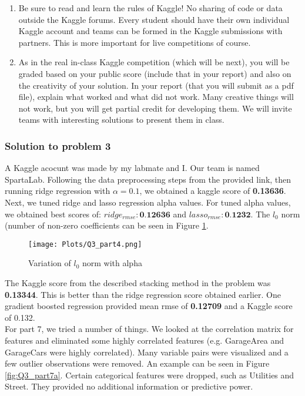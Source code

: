 \documentclass[12pt]{article}%
\begin{document}
\begin{enumerate}
    \item Be sure to read and learn the rules of Kaggle! No sharing of code or data outside the Kaggle forums. Every student should have their own individual Kaggle account and teams can be formed in the Kaggle submissions with partners. This is more important for live competitions of course.
    \item As in the real in-class Kaggle competition (which will be next), you will be graded based on your public score (include that in your report) and also on the creativity of your solution. In your report (that you will submit as a pdf file), explain what worked and what did not work. Many creative things will not work, but you will get partial credit for developing them. We will invite teams with interesting solutions to present them in class.\\
\end{enumerate}

\subsubsection{Solution to problem 3}

A Kaggle acocunt was made by my labmate and I. Our team is named SpartaLab. Following the data preprocessing steps from the provided link, then running ridge regression with $\alpha = 0.1$, we obtained a kaggle score of \textbf{0.13636}. Next, we tuned ridge and lasso regression alpha values. For tuned alpha values, we obtained best scores of: $ridge_{rmse}: \textbf{0.12636}$ and $lasso_{rmse}: \textbf{0.1232}$. The $l_0$ norm (number of non-zero coefficients can be seen in Figure \ref{fig:Q3_part4}.

\begin{figure}[h]
\texttt{[image: Plots/Q3\_part4.png]}
\centering
\caption{Variation of $l_0$ norm with alpha}
\label{fig:Q3_part4}
\centering
\end{figure}

The Kaggle score from the described stacking method in the problem was \textbf{0.13344}. This is better than the ridge regression score obtained earlier. One gradient boosted regression provided mean rmse of \textbf{0.12709} and a Kaggle score of 0.132.\\

For part 7, we tried a number of things. We looked at the correlation matrix for features and eliminated some highly correlated features (e.g. GarageArea and GarageCars were highly correlated). Many variable pairs were visualized and a few outlier observations were removed. An example can be seen in Figure \ref{fig:Q3_part7a}. Certain categorical features were dropped, such as Utilities and Street. They provided no additional information or predictive power.\\
\end{document}
